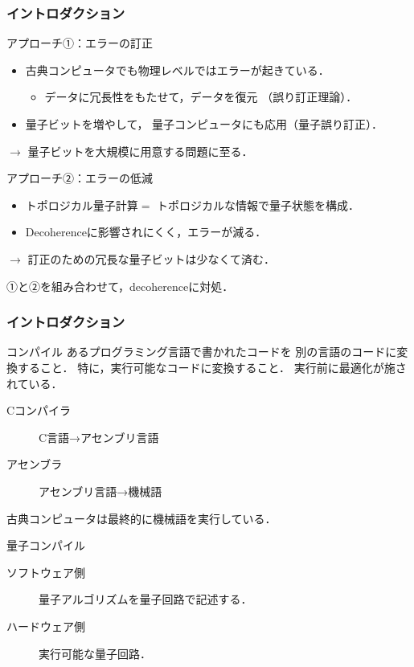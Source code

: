 \documentclass{beamer} %
\theoremstyle{example}
\begin{document}
\begin{frame}
  \frametitle{イントロダクション}
  \begin{block}{アプローチ①：エラーの訂正}
    \begin{itemize}
      \item 古典コンピュータでも物理レベルではエラーが起きている．
            \begin{itemize}
              \item データに冗長性をもたせて，データを復元
                    （誤り訂正理論）．
            \end{itemize}
      \item 量子ビットを増やして，
            量子コンピュータにも応用（量子誤り訂正）．
    \end{itemize}
    \begin{center}
      \(\longrightarrow\)
      量子ビットを大規模に用意する問題に至る．
    \end{center}
  \end{block}

  \begin{block}{アプローチ②：エラーの低減}
    \begin{itemize}
      \item \alert{トポロジカル量子計算}\(=\)
            トポロジカルな情報で量子状態を構成．
      \item Decoherenceに影響されにくく，エラーが減る．
    \end{itemize}
    \begin{center}
      \(\longrightarrow\)
      訂正のための冗長な量子ビットは少なくて済む．
    \end{center}
  \end{block}

  \begin{block}{}
    ①と②を組み合わせて，decoherenceに対処．
  \end{block}
\end{frame}

\begin{frame}
  \frametitle{イントロダクション}
  \begin{exampleblock}{コンパイル}
    あるプログラミング言語で書かれたコードを
    別の言語のコードに変換すること．
    特に，実行可能なコードに変換すること．
    実行前に最適化が施されている．
    \begin{description}
      \item[Cコンパイラ] C言語→アセンブリ言語
      \item[アセンブラ] アセンブリ言語→機械語
    \end{description}
    古典コンピュータは最終的に機械語を実行している．
  \end{exampleblock}

  \begin{block}{量子コンパイル}
    \begin{description}
      \item[ソフトウェア側] 量子アルゴリズムを量子回路で記述する．
      \item[ハードウェア側] 実行可能な量子回路．
    \end{description}
  \end{block}
\end{frame}
\end{document}
